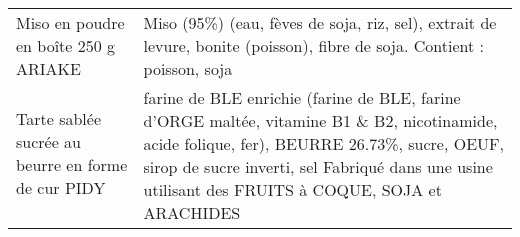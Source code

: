 \begin{longtable}{p{5cm}p{10cm}}
                                                                     Miso en poudre en boîte 250 g ARIAKE &                                                                                                                                                                                                                                                                                                                                                                                                                                                                                                                                                                                                                                                                                                                                                                                                                                                                                                                 Miso (95\%) (eau, fèves de soja, riz, sel), extrait de levure, bonite (poisson), fibre de soja.  Contient : poisson, soja \\
                                                      Tarte sablée sucrée au beurre en forme de cur PIDY &                                                                                                                                                                                                                                                                                                                                                                                                                                                                                                                                                                                                                                                                                                                                                                                       farine de BLE enrichie (farine de BLE, farine d'ORGE maltée, vitamine B1 \& B2, nicotinamide, acide folique, fer), BEURRE 26.73\%, sucre, OEUF, sirop de sucre inverti, sel  Fabriqué dans une usine utilisant des FRUITS à COQUE, SOJA et ARACHIDES \\

\end{longtable}
